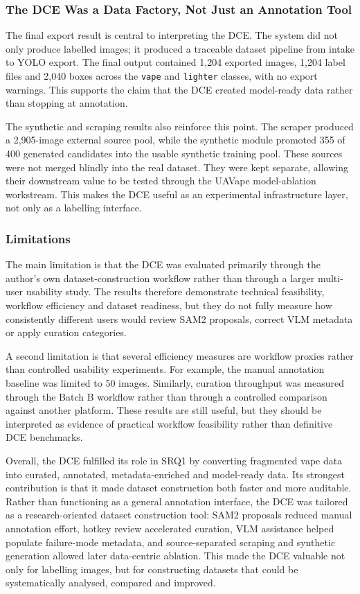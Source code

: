 \subsubsection{The DCE Was a Data Factory, Not Just an Annotation Tool}

The final export result is central to interpreting the DCE. The system did not only produce labelled images; it produced a traceable dataset pipeline from intake to YOLO export. The final output contained 1,204 exported images, 1,204 label files and 2,040 boxes across the \texttt{vape} and \texttt{lighter} classes, with no export warnings. This supports the claim that the DCE created model-ready data rather than stopping at annotation.

The synthetic and scraping results also reinforce this point. The scraper produced a 2,905-image external source pool, while the synthetic module promoted 355 of 400 generated candidates into the usable synthetic training pool. These sources were not merged blindly into the real dataset. They were kept separate, allowing their downstream value to be tested through the UAVape model-ablation workstream. This makes the DCE useful as an experimental infrastructure layer, not only as a labelling interface.

\subsubsection{Limitations}

The main limitation is that the DCE was evaluated primarily through the author's own dataset-construction workflow rather than through a larger multi-user usability study. The results therefore demonstrate technical feasibility, workflow efficiency and dataset readiness, but they do not fully measure how consistently different users would review SAM2 proposals, correct VLM metadata or apply curation categories.

A second limitation is that several efficiency measures are workflow proxies rather than controlled usability experiments. For example, the manual annotation baseline was limited to 50 images. Similarly, curation throughput was measured through the Batch B workflow rather than through a controlled comparison against another platform. These results are still useful, but they should be interpreted as evidence of practical workflow feasibility rather than definitive DCE benchmarks.

Overall, the DCE fulfilled its role in SRQ1 by converting fragmented vape data into curated, annotated, metadata-enriched and model-ready data. Its strongest contribution is that it made dataset construction both faster and more auditable. Rather than functioning as a general annotation interface, the DCE was tailored as a research-oriented dataset construction tool: SAM2 proposals reduced manual annotation effort, hotkey review accelerated curation, VLM assistance helped populate failure-mode metadata, and source-separated scraping and synthetic generation allowed later data-centric ablation. This made the DCE valuable not only for labelling images, but for constructing datasets that could be systematically analysed, compared and improved.


